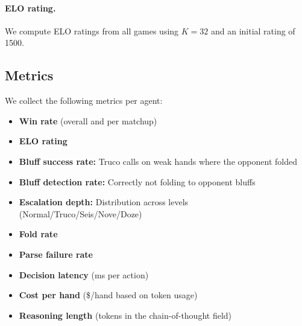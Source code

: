 \paragraph{ELO rating.} We compute ELO ratings from all games using $K = 32$ and an initial rating of 1500.

\subsection{Metrics}

We collect the following metrics per agent:

\begin{itemize}
    \item \textbf{Win rate} (overall and per matchup)
    \item \textbf{ELO rating}
    \item \textbf{Bluff success rate:} Truco calls on weak hands where the opponent folded
    \item \textbf{Bluff detection rate:} Correctly not folding to opponent bluffs
    \item \textbf{Escalation depth:} Distribution across levels (Normal/Truco/Seis/Nove/Doze)
    \item \textbf{Fold rate}
    \item \textbf{Parse failure rate}
    \item \textbf{Decision latency} (ms per action)
    \item \textbf{Cost per hand} (\$/hand based on token usage)
    \item \textbf{Reasoning length} (tokens in the chain-of-thought field)
\end{itemize}
